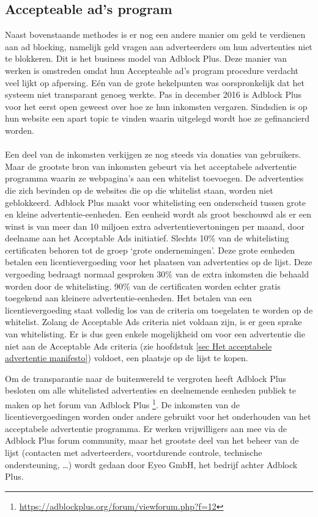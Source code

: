 \documentclass[pdftex,a4paper,12pt,twoside]{report}
\begin{document}
\subsection{ Accepteable ad's program}
\label{sec:Accepteable ad's program}
Naast bovenstaande methodes is er nog een andere manier om geld te verdienen aan ad blocking, namelijk geld vragen aan adverteerders om hun advertenties niet te blokkeren. Dit is het business model van Adblock Plus. Deze manier van werken is omstreden omdat hun Accepteable ad's program procedure verdacht veel lijkt op afpersing. Eén van de grote hekelpunten was oorspronkelijk dat het systeem niet transparant genoeg werkte. Pas in december 2016 is Adblock Plus voor het eerst open geweest over hoe ze hun inkomsten vergaren. Sindsdien is op hun website een apart topic te vinden waarin uitgelegd wordt hoe ze gefinancierd worden. 
\\
\\
Een deel van de inkomsten verkijgen ze nog steeds via donaties van gebruikers.
Maar de grootste bron van inkomsten gebeurt via het acceptabele advertentie programma waarin ze webpagina's aan een whitelist toevoegen. De advertenties die zich bevinden op de websites die op die whitelist staan, worden niet geblokkeerd. 
Adblock Plus maakt voor whitelisting een onderscheid tussen grote en kleine advertentie-eenheden. Een eenheid wordt als groot beschouwd als er een winst is van meer dan 10 miljoen extra advertentievertoningen per maand, door deelname aan het Acceptable Ads initiatief. Slechts 10\% van de whitelisting certificaten behoren tot de groep ‘grote ondernemingen’. Deze grote eenheden betalen een licentievergoeding voor het plaatsen van advertenties op de lijst. Deze vergoeding bedraagt normaal gesproken 30\% van de extra inkomsten die behaald worden door de whitelisting. 90\% van de certificaten worden echter gratis toegekend aan kleinere advertentie-eenheden. Het betalen van een licentievergoeding staat volledig los van de criteria om toegelaten te worden op de whitelist. Zolang de Acceptable Ads criteria niet voldaan zijn, is er geen sprake van whitelisting. Er is dus geen enkele mogelijkheid om voor een advertentie die niet aan de Acceptable Ads criteria (zie hoofdstuk \ref{sec Het acceptabele advertentie manifesto}) voldoet, een plaatsje op de lijst te kopen.

Om de transparantie naar de buitenwereld te vergroten heeft Adblock Plus besloten om alle whitelisted advertenties en deelnemende eenheden publiek te maken op het forum van Adblock Plus \footnote{\url{https://adblockplus.org/forum/viewforum.php?f=12}}.
De inkomsten van de licentievergoedingen worden onder andere gebruikt voor het onderhouden van het acceptabele advertentie programma. Er werken vrijwilligers aan mee via de Adblock Plus forum community, maar het grootste deel van het beheer van de lijst (contacten met adverteerders, voortdurende controle, technische ondersteuning, …) wordt gedaan  door Eyeo GmbH, het bedrijf achter Adblock Plus.
\end{document}
